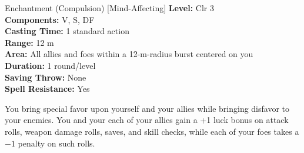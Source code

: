 {Enchantment (Compulsion) [Mind-Affecting]}
{
	\textbf{Level:}
	Clr 3\\
	\textbf{Components:}
	V, S, DF\\
	\textbf{Casting Time:}
	1 standard action\\
	\textbf{Range:}
	12 m\\
	\textbf{Area:}
	All allies and foes within a 12-m-radius burst centered on you\\
	\textbf{Duration:}
	1 round/level\\
	\textbf{Saving Throw:}
	None\\
	\textbf{Spell Resistance:}
	Yes\\
}
{
	You bring special favor upon yourself and your allies while bringing disfavor to your enemies. You and your each of your allies gain a +1 luck bonus on attack rolls, weapon damage rolls, saves, and skill checks, while each of your foes takes a $-1$ penalty on such rolls.

}
